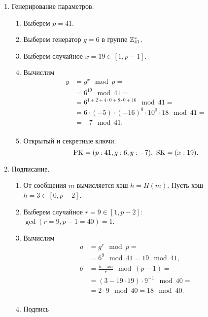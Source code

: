 \begin{enumerate}
    \item Генерирование параметров.
        \begin{enumerate}
            \item Выберем $p=41$.
            \item Выберем генератор $g=6$ в группе $\mathbb{Z}_{41}^*$.
            \item Выберем случайное $x = 19 \in [1, p-1]$.%
            \item Вычислим
                \[ \begin{array}{ll}
                    y & = g^x \mod p = \\
                    & = 6^{19} \mod 41 = \\
                    & = 6^{1 + 2 + 4 \cdot 0 + 8 \cdot 0 + 16} \mod 41 = \\
                    & = 6 \cdot (-5) \cdot (-16)^0 \cdot 10^0 \cdot 18 \mod 41 = \\
                    & = -7 \mod 41. \\
                \end{array} \]
            \item Открытый и секретные ключи:
                \[ \textrm{PK} = (p:41, g:6, y:-7), ~ \textrm{SK} = (x:19). \]
        \end{enumerate}
    \item Подписание.
        \begin{enumerate}
            \item От сообщения $m$ вычисляется хэш $h = H(m)$. Пусть хэш $h  = 3 \in [0, p-2]$.
            \item Выберем случайное $r = 9 \in [1, p-2]$: \\
                $\gcd(r=9, p-1 = 40) = 1$.
            \item Вычислим
                \[ \begin{array}{ll}
                    a & = g^r \mod p = \\
                      & = 6^9 \mod 41 = 19 \mod 41, \\
                    b & = \frac{h - xa}{r} \mod (p-1) = \\
                      & = (3 - 19 \cdot 19) \cdot 9^{-1} \mod 40 = \\
                      & = 2 \cdot 9 \mod 40 = 18 \mod 40. \\
                \end{array} \]
            \item Подпись

\end{enumerate}
\end{enumerate}
